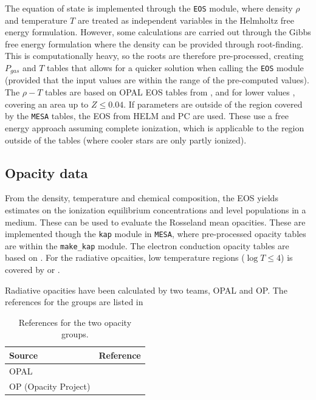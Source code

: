 The equation of state is implemented through the \texttt{EOS} module, where density $\rho$ and temperature $T$ are treated as independent variables in the Helmholtz free energy formulation. However, some calculations are carried out through the Gibbs free energy formulation where the density can be provided through root-finding. This is computationally heavy, so the roots are therefore pre-processed, creating $P_{gas}$ and $T$ tables that allows for a quicker solution when calling the \texttt{EOS} module (provided that the input values are within the range of the pre-computed values). The $\rho-T$ tables are based on OPAL EOS tables from \citet{rogers2002updated}, and for lower values \citet{saumon1995equation}, covering an area up to $Z \leqslant 0.04$. If parameters are outside of the region covered by the \texttt{MESA} tables, the EOS from HELM \citep{timmes2000accuracy} and PC \citep{potekhin2010thermodynamic} are used. These use a free energy approach assuming complete ionization, which is applicable to the region outside of the tables (where cooler stars are only partly ionized). 

\subsection{Opacity data}

From the density, temperature and chemical composition, the EOS yields estimates on the ionization equilibrium concentrations and level populations in a medium. These can be used to evaluate the Rosseland mean opacities. These are implemented though the \texttt{kap} module in \texttt{MESA}, where pre-processed opacity tables are within the \texttt{make\_kap} module. The electron conduction opacity
tables are based on \citet{cassisi2007updated}. For the radiative opcaities, low temperature regions ($\log T \leqslant 4$) is covered by \citet{freedman2008line} or \citet{ferguson2005low}.

Radiative opacities have been calculated by two teams, OPAL and OP. The references for the groups are listed in 

\begin{table}
	\centering
	\caption{References for the two opacity groups.}
	\label{opaci}
	\begin{tabular}{ll}
		\toprule
		Source               & Reference \\
		\midrule
		OPAL                 &   \citet{iglesias1996updated}        \\
		OP (Opacity Project) &  \citet{badnell2005updated}       \\ 
		\bottomrule
	\end{tabular}
\end{table} 

